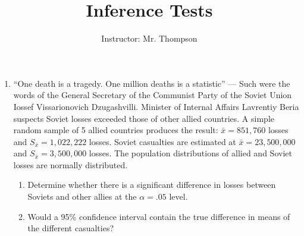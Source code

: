 \documentclass[12pt]{article}
\title{Inference Tests}
\author{\small Instructor: Mr. Thompson}
\date{}
\begin{document}
\maketitle

\begin{enumerate}

  \item “One death is a tragedy. One million deaths is a statistic” — Such were the words of the General Secretary of the Communist Party of the Soviet Union Iossef Vissarionovich Dzugashvilli. Minister of Internal Affairs Lavrentiy Beria suspects Soviet losses exceeded those of other allied countries. A simple random sample of 5 allied countries produces the result: $\bar{x} = 851,760$ losses and $S_{\bar{x}} = 1,022,222$ losses. Soviet casualties are estimated at $\bar{x} = 23,500,000$ and $S_{\bar{x}} = 3,500,000$ losses. The population distributions of allied and Soviet losses are normally distributed. 

    \begin{enumerate}

      \item Determine whether there is a significant difference in losses between Soviets and other allies at the $\alpha = .05$ level.

      \item Would a 95\% confidence interval contain the true difference in means of the different casualties?

    \end{enumerate}

\end{enumerate}
\end{document}
